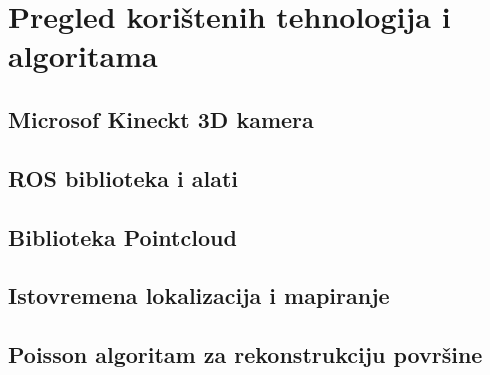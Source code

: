 \newpage
\setcounter{figure}{0}

\section{Pregled korištenih tehnologija i algoritama} %
\label{sec:Tehnologija i teorija}


\subsection{Microsof Kineckt 3D kamera} %
\label{sub:Microsof Kineckt 3D kamera}


\subsection{ROS biblioteka i alati} %
\label{sub:ROS biblioteka i alati}


\subsection{Biblioteka Pointcloud} %
\label{sub:Biblioteka Pointcloud}



\subsection{Istovremena lokalizacija i mapiranje} %
\label{sub:Slam}


\subsection{Poisson algoritam za rekonstrukciju površine} %
\label{sub:Poisson}


